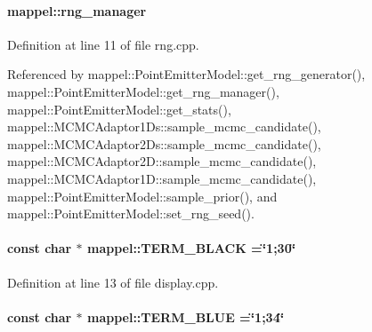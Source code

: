 \paragraph[{\texorpdfstring{rng\+\_\+manager}{rng_manager}}]{ mappel\+::rng\+\_\+manager}\hypertarget{namespacemappel_abe2a4321a80f2384995f3c288131d4c0}{}\label{namespacemappel_abe2a4321a80f2384995f3c288131d4c0}


Definition at line 11 of file rng.\+cpp.



Referenced by mappel\+::\+Point\+Emitter\+Model\+::get\+\_\+rng\+\_\+generator(), mappel\+::\+Point\+Emitter\+Model\+::get\+\_\+rng\+\_\+manager(), mappel\+::\+Point\+Emitter\+Model\+::get\+\_\+stats(), mappel\+::\+M\+C\+M\+C\+Adaptor1\+Ds\+::sample\+\_\+mcmc\+\_\+candidate(), mappel\+::\+M\+C\+M\+C\+Adaptor2\+Ds\+::sample\+\_\+mcmc\+\_\+candidate(), mappel\+::\+M\+C\+M\+C\+Adaptor2\+D\+::sample\+\_\+mcmc\+\_\+candidate(), mappel\+::\+M\+C\+M\+C\+Adaptor1\+D\+::sample\+\_\+mcmc\+\_\+candidate(), mappel\+::\+Point\+Emitter\+Model\+::sample\+\_\+prior(), and mappel\+::\+Point\+Emitter\+Model\+::set\+\_\+rng\+\_\+seed().

\paragraph[{\texorpdfstring{T\+E\+R\+M\+\_\+\+B\+L\+A\+CK}{TERM_BLACK}}]{\setlength{\rightskip}{0pt plus 5cm}const char $\ast$ mappel\+::\+T\+E\+R\+M\+\_\+\+B\+L\+A\+CK =\char`\"{}1;30\char`\"{}}\hypertarget{namespacemappel_a448ca8ea08b3b9cdf522884ac004d901}{}\label{namespacemappel_a448ca8ea08b3b9cdf522884ac004d901}


Definition at line 13 of file display.\+cpp.

\paragraph[{\texorpdfstring{T\+E\+R\+M\+\_\+\+B\+L\+UE}{TERM_BLUE}}]{\setlength{\rightskip}{0pt plus 5cm}const char $\ast$ mappel\+::\+T\+E\+R\+M\+\_\+\+B\+L\+UE =\char`\"{}1;34\char`\"{}}\hypertarget{namespacemappel_a04365b9f87e9c572c79e2da4ff4a0378}{}\label{namespacemappel_a04365b9f87e9c572c79e2da4ff4a0378}


